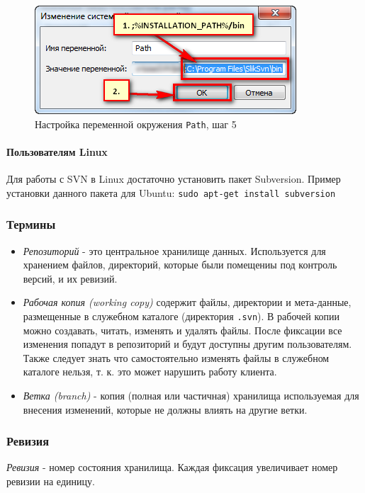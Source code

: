 \documentclass[a4paper,12pt]{article}
\begin{document}
\begin{figure}[!h]
	\centering
	\includegraphics[scale=0.70]{slik-svn-configuration-step-5.png}
	\caption{Настройка переменной окружения \texttt{Path}, шаг 5}
\end{figure}

\paragraph{Пользователям Linux}
Для работы с SVN в Linux достаточно установить пакет Subversion.
Пример установки данного пакета для Ubuntu: \texttt{sudo apt-get install
subversion}
 
\subsubsection{Термины}

\begin{itemize}
\item
  \emph{Репозиторий} - это центральное хранилище данных. Используется
  для хранением файлов, директорий, которые были помещениы под контроль
  версий, и их ревизий.
\item
  \emph{Рабочая копия (working copy)} содержит файлы, директории и
  мета-данные, размещенные в служебном каталоге (директория
  \texttt{.svn}). В рабочей копии можно создавать, читать, изменять и
  удалять файлы. После фиксации все изменения попадут в репозиторий и
  будут доступны другим пользователям. Также следует знать что
  самостоятельно изменять файлы в служебном каталоге нельзя, т. к. это
  может нарушить работу клиента.
\item
  \emph{Ветка (branch)} - копия (полная или частичная) хранилища
  используемая для внесения изменений, которые не должны влиять на
  другие ветки.
\end{itemize}

\subsubsection{Ревизия}

\emph{Ревизия} - номер состояния хранилища. Каждая фиксация увеличивает
номер ревизии на единицу.
\end{document}
